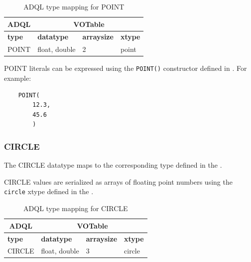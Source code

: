 \documentclass[11pt,a4paper]{ivoa}
\begin{document}
\begin{table}[th]\footnotesize
    \begin{tabular}
        {|p{}|p{}|p{}|p{}|}
        \hline

        \hline
        \multicolumn{1}{|c|}{\textbf{ADQL}} &
        \multicolumn{3}{|c|}{\textbf{VOTable}}
        \tabularnewline
        
        \hline
        \textbf{type} &
        \textbf{datatype} &
        \textbf{arraysize} &
        \textbf{xtype}
        \tabularnewline

        \hline
        POINT &
        float, double &
        2 &
        point
        \tabularnewline

        \hline
    \end{tabular}
    \caption{ADQL type mapping for POINT}
    \label{table:types.geom.point}
\end{table}

POINT literals can be expressed using the \verb:POINT():
constructor defined in .
For example:
\begin{verbatim}
    POINT(
        12.3,
        45.6
        )
\end{verbatim}


\subsubsection{CIRCLE}
\label{sec:types.geom.circle}

The CIRCLE datatype maps to the corresponding type defined in the
\DALISpec.

CIRCLE values are serialized as arrays of floating point numbers
using the \verb:circle: xtype defined in the \DALISpec.

\begin{table}[th]\footnotesize
    \begin{tabular}
        {|p{}|p{}|p{}|p{}|}
        \hline

        \hline
        \multicolumn{1}{|c|}{\textbf{ADQL}} &
        \multicolumn{3}{|c|}{\textbf{VOTable}}
        \tabularnewline
        
        \hline
        \textbf{type} &
        \textbf{datatype} &
        \textbf{arraysize} &
        \textbf{xtype}
        \tabularnewline

        \hline
        CIRCLE &
        float, double &
        3 &
        circle
        \tabularnewline

        \hline
    \end{tabular}
    \caption{ADQL type mapping for CIRCLE}
    \label{table:types.geom.circle}
\end{table}
\end{document}
